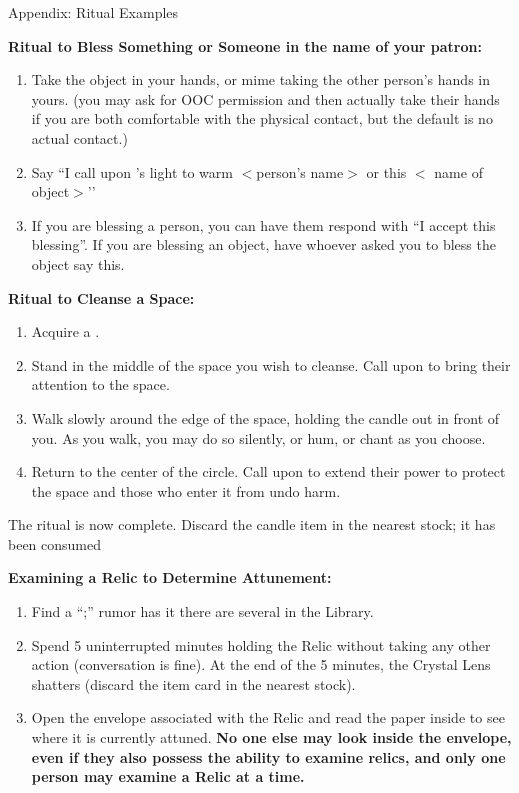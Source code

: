 \documentclass[green]{GL2020}
\begin{document}
{\Large Appendix: Ritual Examples}

\textbf{Ritual to Bless Something or Someone in the name of your patron:}
  \begin{enumerate}
    \item Take the object in your hands, or mime taking the other person’s hands in yours. (you may ask for OOC permission and then actually take their hands if you are both comfortable with the physical contact, but the default is no actual contact.)
    \item Say ``I call upon \cFarmGod{}’s light to warm $<$person’s name$>$ or this $<$ name of object$>$’’
    \item If you are blessing a person, you can have them respond with ``I accept this blessing''. If you are blessing an object, have whoever asked you to bless the object say this.
  \end{enumerate}

\textbf{Ritual to Cleanse a Space:}
  \begin{enumerate}
    \item Acquire a \iRitualCandle{}.
    \item Stand in the middle of the space you wish to cleanse. Call upon \cFarmGod{} to bring their attention to the space.
    \item Walk slowly around the edge of the space, holding the candle out in front of you. As you walk, you may do so silently, or hum, or chant as you choose.
    \item Return to the center of the circle. Call upon \cFarmGod{} to extend their power to protect the space and those who enter it from undo harm.
  \end{enumerate}
The ritual is now complete. Discard the candle item in the nearest stock; it has been consumed
   
\textbf{Examining a Relic to Determine Attunement:}
  \begin{enumerate}
    \item Find a ``\iCrystalLens{};'' rumor has it there are several in the Library. 
    \item Spend 5 uninterrupted minutes holding the Relic without taking any other action (conversation is fine). At the end of the 5 minutes, the Crystal Lens shatters (discard the item card in the nearest stock). 
    \item Open the envelope associated with the Relic and read the paper inside to see where it is currently attuned. \textbf{No one else may look inside the envelope, even if they also possess the ability to examine relics, and only one person may examine a Relic at a time.}
  \end{enumerate}
   
\end{document}
